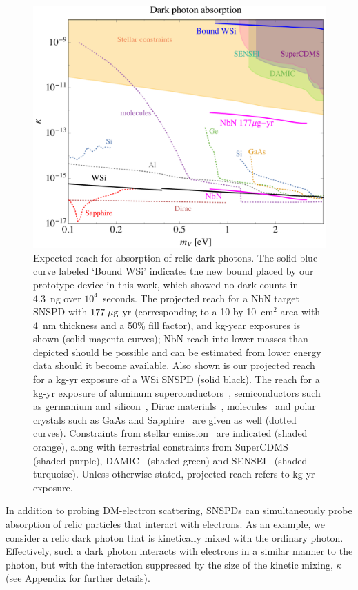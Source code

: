\documentclass[twocolumn,10pt,prl,nofootinbib,preprintnumbers]{revtex4-1}
\begin{document}
\begin{figure}[th!]
\includegraphics[width=.48\textwidth]{Plots/abs_HP_final.pdf} 
\caption{
\label{fig:abs}
Expected reach for absorption of relic dark photons. The solid blue
curve labeled `Bound WSi' indicates the new bound placed by our
prototype device in this work, which showed no dark counts in 4.3~ng over $10^4$~seconds. The projected reach for a NbN target SNSPD
with $177\;\mu{\rm g}$-yr (corresponding to a 10 by 10~cm$^2$ area with
4~nm thickness and a 50\% fill factor), and kg-year exposures is shown
(solid magenta curves); NbN reach into lower masses than depicted should be
possible and can be estimated from lower energy data should it become
available. Also shown is our projected reach for a kg-yr exposure of a WSi SNSPD (solid black). The reach for a kg-yr exposure of
aluminum superconductors~\cite{Hochberg:2016ajh}, semiconductors such
as germanium and silicon~\cite{Hochberg:2016sqx}, Dirac
materials~\cite{Hochberg:2017wce}, molecules~\cite{Arvanitaki:2017nhi}
and polar crystals such as GaAs and Sapphire~\cite{Griffin:2018bjn}
are given as well (dotted curves). Constraints from stellar
emission~\cite{An:2013yua,An:2014twa} are indicated (shaded
orange), along with terrestrial constraints from
SuperCDMS~\cite{Agnese:2018col} (shaded purple), 
DAMIC~\cite{Aguilar-Arevalo:2016zop} (shaded green) and SENSEI~\cite{Abramoff:2019dfb} (shaded turquoise). Unless otherwise stated,
projected reach refers to kg-yr exposure.}
\end{figure}

In addition to probing DM-electron scattering, SNSPDs can simultaneously probe absorption of relic particles that interact with electrons. As an example, we consider a relic dark photon that is kinetically mixed with the ordinary photon. Effectively, such a dark photon interacts with electrons in a similar manner to the photon, but with the interaction suppressed by the size of the kinetic mixing, $\kappa$ (see Appendix for further details).
\end{document}
